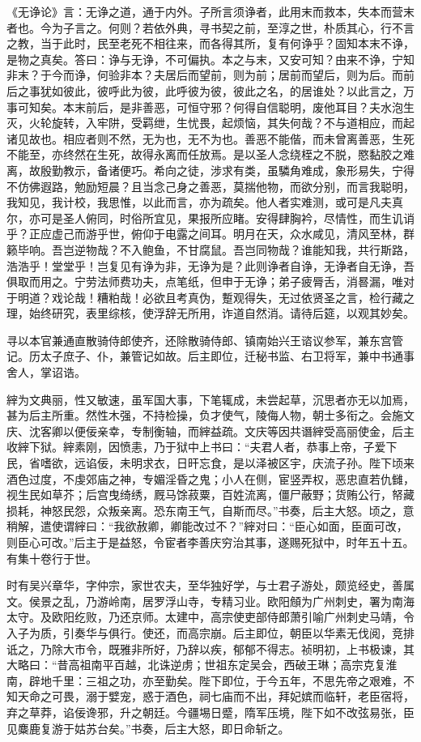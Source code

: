 \documentclass[]{article}
\begin{document}
《无诤论》言：无诤之道，通于内外。子所言须诤者，此用末而救本，失本而营末者也。今为子言之。何则？若依外典，寻书契之前，至淳之世，朴质其心，行不言之教，当于此时，民至老死不相往来，而各得其所，复有何诤乎？固知本末不诤，是物之真矣。答曰：诤与无诤，不可偏执。本之与末，又安可知？由来不诤，宁知非末？于今而诤，何验非本？夫居后而望前，则为前；居前而望后，则为后。而前后之事犹如彼此，彼呼此为彼，此呼彼为彼，彼此之名，的居谁处？以此言之，万事可知矣。本末前后，是非善恶，可恒守邪？何得自信聪明，废他耳目？夫水泡生灭，火轮旋转，入牢阱，受羁绁，生忧畏，起烦恼，其失何哉？不与道相应，而起诸见故也。相应者则不然，无为也，无不为也。善恶不能偕，而未曾离善恶，生死不能至，亦终然在生死，故得永离而任放焉。是以圣人念绕桎之不脱，愍黏胶之难离，故殷勤教示，备诸便巧。希向之徒，涉求有类，虽驎角难成，象形易失，宁得不仿佛遐路，勉励短晨？且当念己身之善恶，莫揣他物，而欲分别，而言我聪明，我知见，我计校，我思惟，以此而言，亦为疏矣。他人者实难测，或可是凡夫真尔，亦可是圣人俯同，时俗所宜见，果报所应睹。安得肆胸衿，尽情性，而生讥诮乎？正应虚己而游乎世，俯仰于电露之间耳。明月在天，众水咸见，清风至林，群籁毕响。吾岂逆物哉？不入鲍鱼，不甘腐鼠。吾岂同物哉？谁能知我，共行斯路，浩浩乎！堂堂乎！岂复见有诤为非，无诤为是？此则诤者自诤，无诤者自无诤，吾俱取而用之。宁劳法师费功夫，点笔纸，但申于无诤；弟子疲脣舌，消晷漏，唯对于明道？戏论哉！糟粕哉！必欲且考真伪，蹔观得失，无过依贤圣之言，检行藏之理，始终研究，表里综核，使浮辞无所用，诈道自然消。请待后筵，以观其妙矣。

寻以本官兼通直散骑侍郎使齐，还除散骑侍郎、镇南始兴王谘议参军，兼东宫管记。历太子庶子、仆，兼管记如故。后主即位，迁秘书监、右卫将军，兼中书通事舍人，掌诏诰。

縡为文典丽，性又敏速，虽军国大事，下笔辄成，未尝起草，沉思者亦无以加焉，甚为后主所重。然性木强，不持检操，负才使气，陵侮人物，朝士多衔之。会施文庆、沈客卿以便佞亲幸，专制衡轴，而縡益疏。文庆等因共谮縡受高丽使金，后主收縡下狱。縡素刚，因愤恚，乃于狱中上书曰：``夫君人者，恭事上帝，子爱下民，省嗜欲，远谄佞，未明求衣，日旰忘食，是以泽被区宇，庆流子孙。陛下顷来酒色过度，不虔郊庙之神，专媚淫昏之鬼；小人在侧，宦竖弄权，恶忠直若仇雠，视生民如草芥；后宫曳绮绣，厩马馀菽粟，百姓流离，僵尸蔽野；货贿公行，帑藏损耗，神怒民怨，众叛亲离。恐东南王气，自斯而尽。''书奏，后主大怒。顷之，意稍解，遣使谓縡曰：``我欲赦卿，卿能改过不？''縡对曰：``臣心如面，臣面可改，则臣心可改。''后主于是益怒，令宦者李善庆穷治其事，遂赐死狱中，时年五十五。有集十卷行于世。

时有吴兴章华，字仲宗，家世农夫，至华独好学，与士君子游处，颇览经史，善属文。侯景之乱，乃游岭南，居罗浮山寺，专精习业。欧阳頠为广州刺史，署为南海太守。及欧阳纥败，乃还京师。太建中，高宗使吏部侍郎萧引喻广州刺史马靖，令入子为质，引奏华与俱行。使还，而高宗崩。后主即位，朝臣以华素无伐阅，竞排诋之，乃除大市令，既雅非所好，乃辞以疾，郁郁不得志。祯明初，上书极谏，其大略曰：``昔高祖南平百越，北诛逆虏；世祖东定吴会，西破王琳；高宗克复淮南，辟地千里：三祖之功，亦至勤矣。陛下即位，于今五年，不思先帝之艰难，不知天命之可畏，溺于嬖宠，惑于酒色，祠七庙而不出，拜妃嫔而临轩，老臣宿将，弃之草莽，谄佞谗邪，升之朝廷。今疆埸日蹙，隋军压境，陛下如不改弦易张，臣见麋鹿复游于姑苏台矣。''书奏，后主大怒，即日命斩之。
\end{document}

